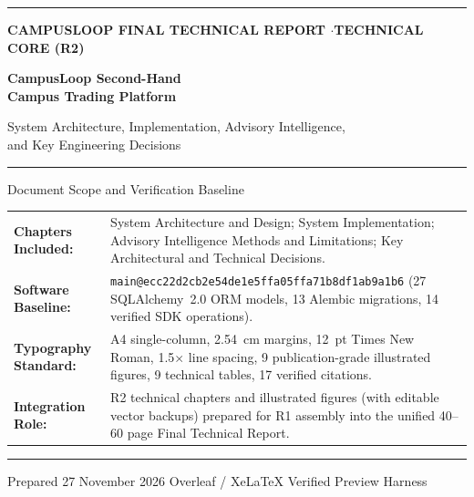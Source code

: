 \documentclass[12pt,a4paper]{report}
\begin{document}
\begin{titlepage}
  \thispagestyle{empty}
  \setlength{\parindent}{0pt}
  \raggedright
  \vspace*{1.4cm}
  {\color{clNavy}\rule{\linewidth}{2.4pt}}\par
  \vspace{0.9cm}
  {\fontsize{11}{13}\selectfont\bfseries\color{clAccent} CAMPUSLOOP FINAL TECHNICAL REPORT \quad$\cdot$\quad TECHNICAL CORE (R2)}\par
  \vspace{0.45cm}
  {\fontsize{24}{30}\selectfont\bfseries\color{clNavy} CampusLoop Second-Hand\\Campus Trading Platform\par}
  \vspace{0.45cm}
  {\Large\color{clSlate} System Architecture, Implementation, Advisory Intelligence,\\and Key Engineering Decisions\par}
  \vspace{0.8cm}
  {\color{clRule}\rule{\linewidth}{0.8pt}}\par
  \vspace{1.1cm}
  \begin{clbox}{Document Scope and Verification Baseline}
    \small
    \begin{tabularx}{\linewidth}{@{}l>{\raggedright\arraybackslash}X@{}}
      \textbf{Chapters Included:} & System Architecture and Design; System Implementation; Advisory Intelligence Methods and Limitations; Key Architectural and Technical Decisions. \\
      \textbf{Software Baseline:} & \texttt{main@ecc22d2cb2e54de1e5ffa05ffa71b8df1ab9a1b6} (27 SQLAlchemy~2.0 ORM models, 13 Alembic migrations, 14 verified SDK operations). \\
      \textbf{Typography Standard:} & A4 single-column, 2.54~cm margins, 12~pt Times New Roman, 1.5$\times$ line spacing, 9 publication-grade illustrated figures, 9 technical tables, 17 verified citations. \\
      \textbf{Integration Role:} & R2 technical chapters and illustrated figures (with editable vector backups) prepared for R1 assembly into the unified 40--60 page Final Technical Report.
    \end{tabularx}
  \end{clbox}
  \vfill
  {\color{clRule}\rule{\linewidth}{0.6pt}}\par
  \vspace{0.35cm}
  {\small\color{clSlate} Prepared 27 November 2026 \hfill Overleaf / XeLaTeX Verified Preview Harness}
\end{titlepage}

\tableofcontents
\listoffigures
\listoftables
\clearpage








\end{document}
